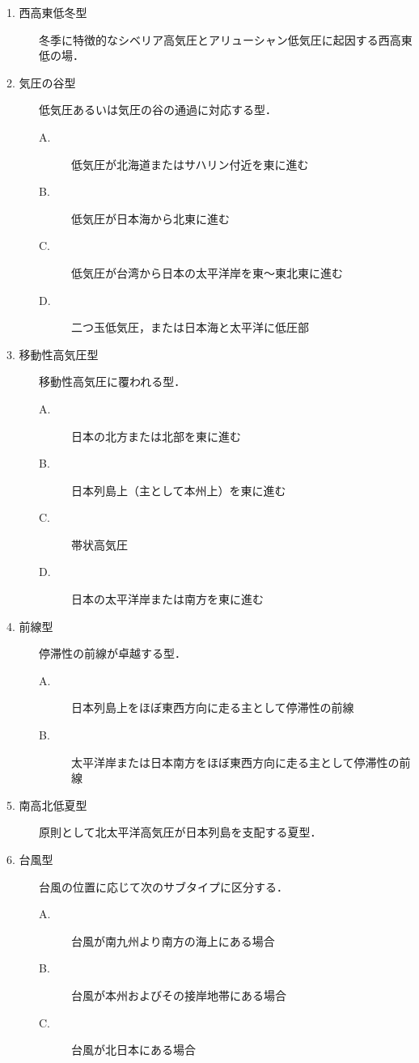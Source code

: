 \documentclass{jarticle}
\theoremstyle{definition}
\begin{document}
\begin{description}
\item[1. 西高東低冬型] 冬季に特徴的なシベリア高気圧とアリューシャン低気圧に起因する西高東低の場．

\item[2. 気圧の谷型] 低気圧あるいは気圧の谷の通過に対応する型．
  \begin{description}
    \item[A.] 低気圧が北海道またはサハリン付近を東に進む
    \item[B.] 低気圧が日本海から北東に進む
    \item[C.] 低気圧が台湾から日本の太平洋岸を東〜東北東に進む
    \item[D.] 二つ玉低気圧，または日本海と太平洋に低圧部
  \end{description}

\item[3. 移動性高気圧型] 移動性高気圧に覆われる型．
  \begin{description}
    \item[A.] 日本の北方または北部を東に進む
    \item[B.] 日本列島上（主として本州上）を東に進む
    \item[C.] 帯状高気圧
    \item[D.] 日本の太平洋岸または南方を東に進む
  \end{description}

\item[4. 前線型] 停滞性の前線が卓越する型．
  \begin{description}
    \item[A.] 日本列島上をほぼ東西方向に走る主として停滞性の前線
    \item[B.] 太平洋岸または日本南方をほぼ東西方向に走る主として停滞性の前線
  \end{description}

\item[5. 南高北低夏型] 原則として北太平洋高気圧が日本列島を支配する夏型．

\item[6. 台風型] 台風の位置に応じて次のサブタイプに区分する．
  \begin{description}
    \item[A.] 台風が南九州より南方の海上にある場合
    \item[B.] 台風が本州およびその接岸地帯にある場合
    \item[C.] 台風が北日本にある場合
  \end{description}
\end{description}
\end{document}
